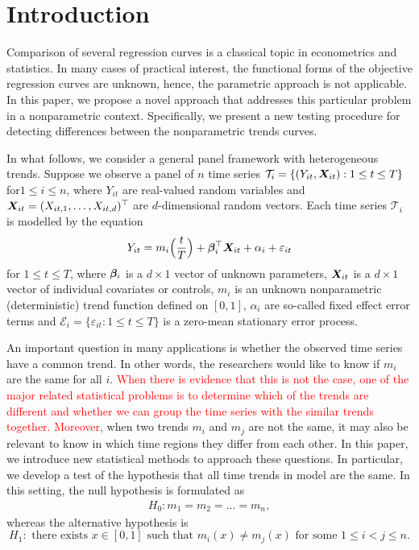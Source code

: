 \documentclass[a4paper,12pt]{article}
\makeatletter
\renewcommand{\eqref}[1]{\tagform@{\ref{#1}}}
\makeatother
\begin{document}
%


\section{Introduction}\label{sec:intro}

Comparison of several regression curves is a classical topic in econometrics and statistics. In many cases of practical interest, the functional forms of the objective regression curves are unknown, hence, the parametric approach is not applicable. In this paper, we propose a novel approach that addresses this particular problem in a nonparametric context. Specifically, we present a new testing procedure for detecting differences between the nonparametric trends curves. 

In what follows, we consider a general panel framework with heterogeneous trends. Suppose we observe a panel of $n$ time series $\mathcal{T}_i = \{ (Y_{it},\boldsymbol{X}_{it}): 1 \le t \le T \}$ for\linebreak $1 \le i \le n$, where $Y_{it}$ are real-valued random variables and $\boldsymbol{X}_{it} = (X_{it,1},\ldots,X_{it,d})^\top$ are $d$-dimensional random vectors. Each time series $\mathcal{T}_i$ is modelled by the equation
\begin{equation}\label{eq:model}
Y_{it} = m_i \Big( \frac{t}{T} \Big) + \bm{\beta}_i^\top \boldsymbol{X}_{it} + \alpha_i + \varepsilon_{it}
\end{equation}
for $1 \le t \le T$, where $\bm{\beta}_i$ is a $d \times 1$ vector of unknown parameters, $\boldsymbol{X}_{it}$ is a $d\times 1$ vector of individual covariates or controls, $m_i$ is an unknown nonparametric (deterministic) trend function defined on $[0,1]$, $\alpha_i$ are so-called fixed effect error terms and \linebreak $\mathcal{E}_i = \{ \varepsilon_{it}: 1 \le t \le T \}$ is a zero-mean stationary error process. 


An important question in many applications is whether the observed time series have a common trend. In other words, the researchers would like to know if $m_i$ are the same for all $i$. \textcolor{red}{When there is evidence that this is not the case, one of the major related statistical problems is to determine which of the trends are different and whether we can group the time series with the similar trends together. Moreover,} when two trends $m_i$ and $m_j$ are not the same, it may also be relevant to know in which time regions they differ from each other. In this paper, we introduce new statistical methods to approach these questions. In particular, we develop a test of the hypothesis that all time trends in model \eqref{eq:model} are the same. In this setting, the null hypothesis is formulated as 
\begin{align}\label{eq:null}
H_0: m_1 = m_2 = \ldots = m_n,
\end{align}
whereas the alternative hypothesis is 
$$H_1: \text{ there exists } x\in [0, 1] \text{ such that } m_i (x) \neq m_j(x) \text{ for some } 1\leq i < j \leq n.$$
\end{document}
